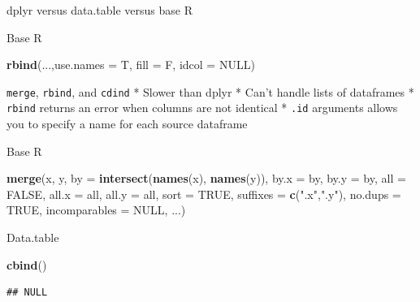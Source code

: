 \documentclass[ignorenonframetext,]{beamer}
\newenvironment{Shaded}{\begin{snugshade}}{\end{snugshade}}
\newcommand{\KeywordTok}[1]{\textcolor[rgb]{0.13,0.29,0.53}{\textbf{#1}}}
\newcommand{\DataTypeTok}[1]{\textcolor[rgb]{0.13,0.29,0.53}{#1}}
\newcommand{\StringTok}[1]{\textcolor[rgb]{0.31,0.60,0.02}{#1}}
\newcommand{\OtherTok}[1]{\textcolor[rgb]{0.56,0.35,0.01}{#1}}
\newcommand{\NormalTok}[1]{#1}
\begin{document}
\begin{frame}[fragile]{dplyr versus data.table versus base R}

\begin{block}{Base R}

\begin{Shaded}
\begin{Highlighting}[]
\KeywordTok{rbind}\NormalTok{(...,}\DataTypeTok{use.names =}\NormalTok{ T, }\DataTypeTok{fill =}\NormalTok{ F, }\DataTypeTok{idcol =} \OtherTok{NULL}\NormalTok{)}
\end{Highlighting}
\end{Shaded}

\texttt{merge}, \texttt{rbind}, and \texttt{cdind} * Slower than dplyr *
Can't handle lists of dataframes * \texttt{rbind} returns an error when
columns are not identical * \texttt{.id} arguments allows you to specify
a name for each source dataframe

\end{block}

\begin{block}{Base R}

\begin{Shaded}
\begin{Highlighting}[]
\KeywordTok{merge}\NormalTok{(x, y, }\DataTypeTok{by =} \KeywordTok{intersect}\NormalTok{(}\KeywordTok{names}\NormalTok{(x), }\KeywordTok{names}\NormalTok{(y)),}
      \DataTypeTok{by.x =}\NormalTok{ by, }\DataTypeTok{by.y =}\NormalTok{ by, }\DataTypeTok{all =} \OtherTok{FALSE}\NormalTok{, }\DataTypeTok{all.x =}\NormalTok{ all, }\DataTypeTok{all.y =}\NormalTok{ all,}
      \DataTypeTok{sort =} \OtherTok{TRUE}\NormalTok{, }\DataTypeTok{suffixes =} \KeywordTok{c}\NormalTok{(}\StringTok{".x"}\NormalTok{,}\StringTok{".y"}\NormalTok{), }\DataTypeTok{no.dups =} \OtherTok{TRUE}\NormalTok{,}
      \DataTypeTok{incomparables =} \OtherTok{NULL}\NormalTok{, ...)}
\end{Highlighting}
\end{Shaded}

\end{block}

\begin{block}{Data.table}

\begin{Shaded}
\begin{Highlighting}[]
\KeywordTok{cbind}\NormalTok{()}
\end{Highlighting}
\end{Shaded}

\begin{verbatim}
## NULL
\end{verbatim}

\end{block}

\end{frame}
\end{document}
